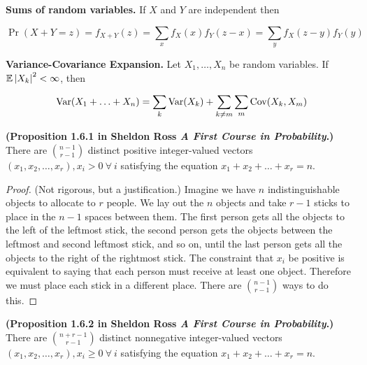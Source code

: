 \begin{theorem}\textbf{Sums of random variables.} If \(X\) and \(Y\) are independent then

\[
\Pr(X + Y = z) = f_{X +Y}(z) = \sum_x f_X(x) f_Y(z-x) = \sum_y f_X(z - y) f_Y(y)
\]

\end{theorem}

\begin{proposition}\textbf{Variance-Covariance Expansion.} Let \(X_1, \ldots, X_n\) be random variables. If \(\E \left|X_k \right|^2 < \infty\), then 

\[
\Var(X_1 + \ldots + X_n) = \sum_k \Var(X_k) + \sum_{k \neq m} \sum_m \Cov(X_k, X_m)
\]
\end{proposition}

\begin{proposition} \label{prob.ross1.6.1} \textbf{(Proposition 1.6.1 in Sheldon Ross \textit{A First Course in Probability}.)} There are \(\binom{n-1}{r-1}\) distinct positive integer-valued vectors \((x_1, x_2, \ldots, x_r), x_i > 0 \ \forall \ i\) satisfying the equation \(x_1 + x_2 + \ldots + x_r = n\).

\end{proposition}

\begin{proof} (Not rigorous, but a justification.) Imagine we have \(n\) indistinguishable objects to allocate to \(r\) people. We lay out the \(n\) objects and take \(r - 1\) sticks to place in the \(n - 1\) spaces between them. The first person gets all the objects to the left of the leftmost stick, the second person gets the objects between the leftmost and second leftmost stick, and so on, until the last person gets all the objects to the right of the rightmost stick. The constraint that \(x_i\) be positive is equivalent to saying that each person must receive at least one object. Therefore we must place each stick in a different place. There are \(\binom{n-1}{r-1}\) ways to do this. 

\end{proof}

\begin{proposition} \label{prob.ross1.6.2} \textbf{(Proposition 1.6.2 in Sheldon Ross \textit{A First Course in Probability}.)} There are \(\binom{n+r-1}{r-1}\) distinct nonnegative integer-valued vectors \((x_1, x_2, \ldots, x_r), x_i \geq 0 \ \forall \ i\) satisfying the equation \(x_1 + x_2 + \ldots + x_r = n\).

\end{proposition}

